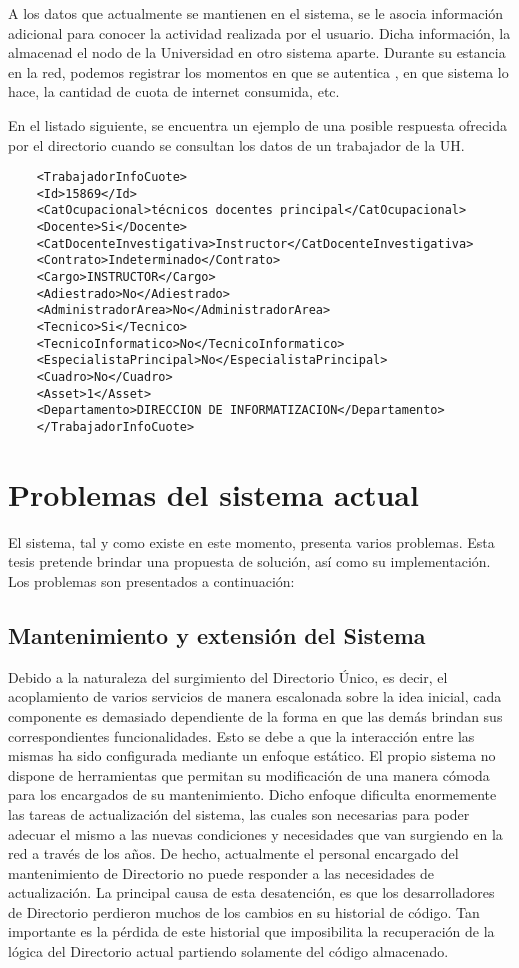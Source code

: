 A los datos que actualmente se mantienen en el sistema, se le asocia información adicional
para conocer la actividad realizada por el usuario. Dicha información, la almacenad el nodo
de la Universidad en otro sistema aparte. Durante su estancia en la red, podemos registrar
los momentos en que se autentica , en que sistema lo hace, la cantidad de cuota de internet
consumida, etc.

En el listado siguiente, se encuentra un ejemplo de una posible respuesta ofrecida por el 
directorio cuando se consultan los datos de un trabajador de la UH.

\begin{verbatim}
	<TrabajadorInfoCuote>
	<Id>15869</Id>
	<CatOcupacional>técnicos docentes principal</CatOcupacional>
	<Docente>Si</Docente>
	<CatDocenteInvestigativa>Instructor</CatDocenteInvestigativa>
	<Contrato>Indeterminado</Contrato>
	<Cargo>INSTRUCTOR</Cargo>
	<Adiestrado>No</Adiestrado>
	<AdministradorArea>No</AdministradorArea>
	<Tecnico>Si</Tecnico>
	<TecnicoInformatico>No</TecnicoInformatico>
	<EspecialistaPrincipal>No</EspecialistaPrincipal>
	<Cuadro>No</Cuadro>
	<Asset>1</Asset>
	<Departamento>DIRECCION DE INFORMATIZACION</Departamento>
	</TrabajadorInfoCuote>
\end{verbatim}

\section{Problemas del sistema actual}

El sistema, tal y como existe en este momento, presenta varios problemas. Esta tesis 
pretende brindar una propuesta de solución, así como su implementación. Los problemas son 
presentados a continuación:

\subsection{Mantenimiento y extensión del Sistema}

Debido a la naturaleza del surgimiento del Directorio Único, es decir, el acoplamiento 
de varios servicios de manera escalonada sobre la idea inicial, cada componente es 
demasiado dependiente de la forma en que las demás brindan sus correspondientes 
funcionalidades. Esto se debe a que la interacción entre las mismas ha sido configurada 
mediante un enfoque estático. El propio sistema no dispone de herramientas que permitan su 
modificación de una manera cómoda para los encargados de su mantenimiento. Dicho enfoque 
dificulta enormemente las tareas de actualización del sistema, las cuales son necesarias 
para poder adecuar el mismo a las nuevas condiciones y necesidades que van surgiendo en la 
red a través de los años. De hecho, actualmente el personal encargado del mantenimiento de
Directorio no puede responder a las necesidades de actualización. La principal causa de 
esta desatención, es que los desarrolladores de Directorio perdieron muchos de los cambios
en su historial de código. Tan importante es la pérdida de este historial que imposibilita
la recuperación de la lógica del Directorio actual partiendo solamente del código almacenado.

